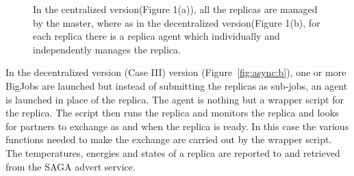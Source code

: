 \documentclass[a4paper,10pt]{article}
\begin{document}
\begin{figure}
\centering
{}
\caption{\small In the centralized version(Figure 1(a)), all the replicas are managed by the master, where as in the decentralized version(Figure 1(b), for each replica there is a replica agent which individually and independently manages the replica.}
\label{fig:async}
\end{figure}
 

In the decentralized version (Case III) version
(Figure~\ref{fig:async:b}), one or more BigJobs are launched
but instead of submitting the replicas as sub-jobs, an agent is
launched in place of the replica. The agent is nothing but a wrapper
script for the replica. The script then runs the replica and monitors
the replica and looks for partners to exchange as and when the replica
is ready. In this case the various functions needed to make the
exchange are carried out by the wrapper script. The temperatures,
energies and states of a replica are reported to and retrieved from
the SAGA advert service. 
\end{document}

